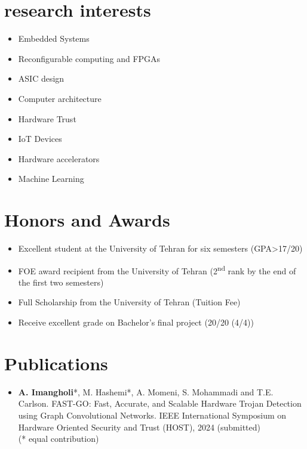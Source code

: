 \documentclass[letterpaper,11pt]{article}
\begin{document}
\section{research interests}
	\begin{multicols}{2}
	\begin{itemize}
		\item Embedded Systems
		\item Reconfigurable computing and FPGAs
		\item ASIC design
		\item Computer architecture
		\item Hardware Trust
		\item IoT Devices
		\item Hardware accelerators
		\item Machine Learning
	\end{itemize}
	\end{multicols}
\section{Honors and Awards}
\begin{itemize}
    \item Excellent student at the University of Tehran for six semesters (GPA\textgreater{}17/20)
    \item FOE award recipient from the University of Tehran (2\textsuperscript{nd} rank by the end of the first two semesters)
    \item Full Scholarship from the University of Tehran (Tuition Fee)
    \item Receive excellent grade on Bachelor's final project (20/20 (4/4))
\end{itemize}
\section{Publications}
\begin{itemize}
    \item \textbf{A. Imangholi}*, M. Hashemi*, A. Momeni, S. Mohammadi and T.E. Carlson. FAST-GO: Fast, Accurate, and Scalable Hardware Trojan Detection using Graph Convolutional Networks. IEEE International Symposium on Hardware Oriented Security and Trust (HOST), 2024 (submitted) \\ (* equal contribution)
\end{itemize}
\end{document}

